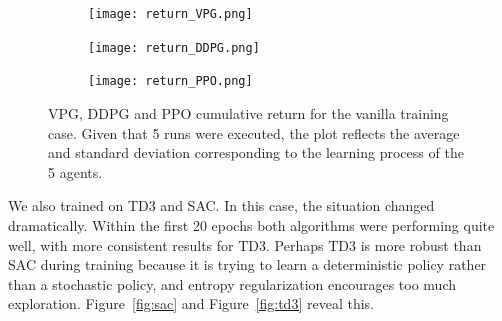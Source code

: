 \begin{figure}[H]
    \centering
     \begin{subfigure}[b]{\textwidth}
         \centering
             \texttt{[image: return\_VPG.png]}
     \end{subfigure}
    \vfill 
     \begin{subfigure}[b]{\textwidth}
         \centering
             \texttt{[image: return\_DDPG.png]}
     \end{subfigure}
     \vfill
     \begin{subfigure}[b]{\textwidth}
         \centering
             \texttt{[image: return\_PPO.png]}
     \end{subfigure}
    \caption{VPG, DDPG and PPO cumulative return for the vanilla training case. Given 
    that 5 runs were executed, the plot reflects the average and standard deviation 
    corresponding to the learning process of the 5 agents.}
    \label{fig:failed_training}
\end{figure}

We also trained on TD3 and SAC. In this case, the situation changed dramatically.
Within the first 20 epochs both algorithms were performing quite well, with more consistent results for TD3. Perhaps TD3 is more robust than SAC during training because it is trying to learn a deterministic policy rather than a stochastic policy, and entropy regularization encourages too much exploration. Figure~\ref{fig:sac} and Figure~\ref{fig:td3} reveal this. 


